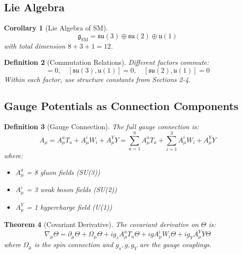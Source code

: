 \documentclass[12pt]{article}
\newtheorem{definition}{Definition}[section]
\newtheorem{theorem}[definition]{Theorem}
\newtheorem{corollary}[definition]{Corollary}
\newcommand{\su}{\mathfrak{su}}
\newcommand{\uu}{\mathfrak{u}}
\begin{document}
\subsection{Lie Algebra}

\begin{corollary}[Lie Algebra of SM]
\begin{equation}
\mathfrak{g}_{\mathrm{SM}} = \su(3) \oplus \su(2) \oplus \uu(1)
\end{equation}
with total dimension $8 + 3 + 1 = 12$.
\end{corollary}

\begin{definition}[Commutation Relations]
Different factors commute:
\begin{equation}
[\su(3), \su(2)] = 0, \quad [\su(3), \uu(1)] = 0, \quad [\su(2), \uu(1)] = 0
\end{equation}
Within each factor, use structure constants from Sections 2-4.
\end{definition}

\subsection{Gauge Potentials as Connection Components}

\begin{definition}[Gauge Connection]
The full gauge connection is:
\begin{equation}
A_\mu = A_\mu^a T_a + A_\mu^i W_i + A_\mu^Y Y = \sum_{a=1}^8 A_\mu^a T_a + \sum_{i=1}^3 A_\mu^i W_i + A_\mu^Y Y
\end{equation}
where:
\begin{itemize}
\item $A_\mu^a$ = 8 gluon fields (SU(3))
\item $A_\mu^i$ = 3 weak boson fields (SU(2))
\item $A_\mu^Y$ = 1 hypercharge field (U(1))
\end{itemize}
\end{definition}

\begin{theorem}[Covariant Derivative]
The covariant derivative on $\Theta$ is:
\begin{equation}
\nabla_\mu \Theta = \partial_\mu \Theta + \Omega_\mu \Theta + ig_s A_\mu^a T_a \Theta + ig A_\mu^i W_i \Theta + ig_Y A_\mu^Y Y \Theta
\end{equation}
where $\Omega_\mu$ is the spin connection and $g_s, g, g_Y$ are the gauge couplings.
\end{theorem}
\end{document}
